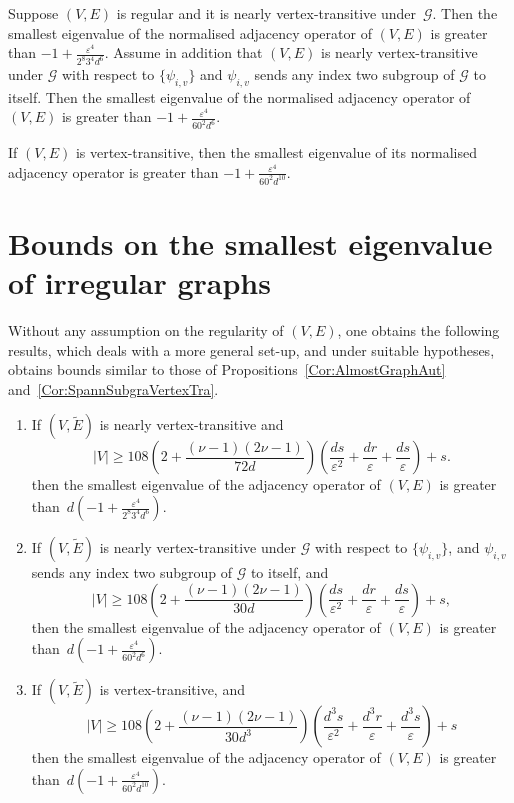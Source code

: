 \documentclass[ALCO,Unicode,published]{cedram}
\newcommand{\calG}{\ensuremath{\mathcal{G}}}
\begin{document}
\begin{proposition}
\label{Cor:AlmostGraphAut}
Suppose $(V, E)$ is regular and it is nearly vertex-transitive under~$\calG$. Then the smallest eigenvalue of the normalised adjacency operator of $(V, E)$ is greater than $-1+ \frac {\varepsilon^4}{2^{8}3^{4}d^6}$. 
Assume in addition that $(V, E)$ is nearly vertex-transitive under $\calG$ with respect to $\{\psi_{i,v}\}$ and $\psi_{i, v}$ sends any index two subgroup of $\calG$ to itself. Then the smallest eigenvalue of the normalised adjacency operator of $(V, E)$ is greater than $ -1+\frac {\varepsilon^4}{60^2 d^6}$. 
\end{proposition}

\begin{proposition}
\label{Cor:SpannSubgraVertexTra}
If $(V, E)$ is vertex-transitive, then the smallest eigenvalue of its normalised adjacency operator is greater than $ -1+\frac {\varepsilon^4}{60^2 d^{10}}$. 
\end{proposition}

\section{Bounds on the smallest eigenvalue of irregular graphs} 

Without any assumption on the regularity of $(V, E)$, one obtains the following results, which deals with a more general set-up, and under suitable hypotheses, obtains bounds similar to those of Propositions~\ref{Cor:AlmostGraphAut} and~\ref{Cor:SpannSubgraVertexTra}. 

\begin{proposition}\label{Prop:SpannSubgraVertexTraEigenBdd}
\quad
\begin{enumerate}
\item 
If 
$(V, \widetilde E)$ is nearly vertex-transitive and 
$$
|V| 
\geq 
108
\left( 2 + \frac {(\nu-1)(2\nu -1)}  {72d} \right)  
\left( \frac{ds}{\varepsilon^2} + \frac{dr}\varepsilon +\frac{ds}{\varepsilon}\right) + s .$$
then the smallest eigenvalue of the adjacency operator of $(V, E)$ is 
greater than~$ d (-1 + \frac{\varepsilon^4 }{2^{8}3^{4} d^{6}})
$. 

\item 
If $(V, \widetilde E)$ is nearly vertex-transitive under $\calG$ with respect to $\{\psi_{i,v}\}$, and $\psi_{i, v}$ sends any index two subgroup of $\calG$ to itself, and 
$$
|V| 
\geq 
108
\left( 2 + \frac {(\nu-1)(2\nu -1)}  {30d}  \right)  
\left( \frac{ds}{\varepsilon^2} + \frac{dr}\varepsilon + \frac{ds}{\varepsilon}\right) + s ,
$$
then the smallest eigenvalue of the adjacency operator of $(V, E)$ is 
greater than~$ d (-1 + \frac{\varepsilon^4 }{60^2 d^{6}})
$. 

\item 
If $(V, \widetilde E)$ is vertex-transitive, and 
$$
|V| 
\geq 
108
\left( 2 + \frac {(\nu-1)(2\nu -1)}  {30d^3} \right)  
\left( \frac{d^3s}{\varepsilon^2} + \frac{d^3r}\varepsilon+ \frac{d^{3}s}{\varepsilon}\right) + s
$$
then the smallest eigenvalue of the adjacency operator of $(V, E)$ is 
greater than~$ d (-1 + \frac{\varepsilon^4 }{60^2 d^{10}})
$. 
\end{enumerate}
\end{proposition}
\end{document}
